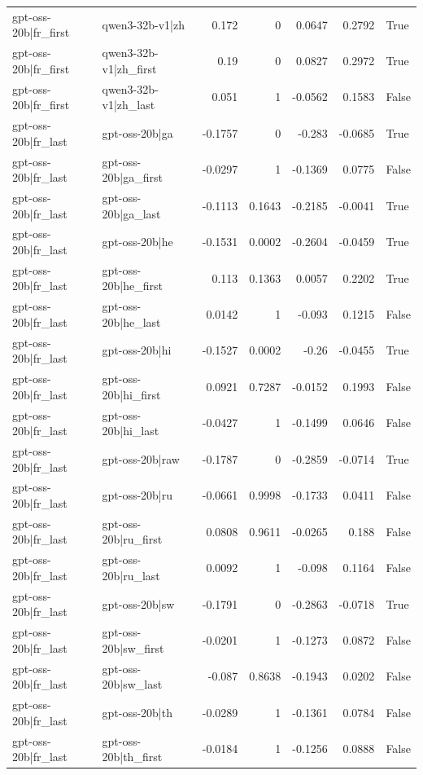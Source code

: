 \begin{table}
\begin{tabular}{l l r r r r l}
gpt-oss-20b|fr_first & qwen3-32b-v1|zh & 0.172 & 0 & 0.0647 & 0.2792 & True \\
gpt-oss-20b|fr_first & qwen3-32b-v1|zh_first & 0.19 & 0 & 0.0827 & 0.2972 & True \\
gpt-oss-20b|fr_first & qwen3-32b-v1|zh_last & 0.051 & 1 & -0.0562 & 0.1583 & False \\
gpt-oss-20b|fr_last & gpt-oss-20b|ga & -0.1757 & 0 & -0.283 & -0.0685 & True \\
gpt-oss-20b|fr_last & gpt-oss-20b|ga_first & -0.0297 & 1 & -0.1369 & 0.0775 & False \\
gpt-oss-20b|fr_last & gpt-oss-20b|ga_last & -0.1113 & 0.1643 & -0.2185 & -0.0041 & True \\
gpt-oss-20b|fr_last & gpt-oss-20b|he & -0.1531 & 0.0002 & -0.2604 & -0.0459 & True \\
gpt-oss-20b|fr_last & gpt-oss-20b|he_first & 0.113 & 0.1363 & 0.0057 & 0.2202 & True \\
gpt-oss-20b|fr_last & gpt-oss-20b|he_last & 0.0142 & 1 & -0.093 & 0.1215 & False \\
gpt-oss-20b|fr_last & gpt-oss-20b|hi & -0.1527 & 0.0002 & -0.26 & -0.0455 & True \\
gpt-oss-20b|fr_last & gpt-oss-20b|hi_first & 0.0921 & 0.7287 & -0.0152 & 0.1993 & False \\
gpt-oss-20b|fr_last & gpt-oss-20b|hi_last & -0.0427 & 1 & -0.1499 & 0.0646 & False \\
gpt-oss-20b|fr_last & gpt-oss-20b|raw & -0.1787 & 0 & -0.2859 & -0.0714 & True \\
gpt-oss-20b|fr_last & gpt-oss-20b|ru & -0.0661 & 0.9998 & -0.1733 & 0.0411 & False \\
gpt-oss-20b|fr_last & gpt-oss-20b|ru_first & 0.0808 & 0.9611 & -0.0265 & 0.188 & False \\
gpt-oss-20b|fr_last & gpt-oss-20b|ru_last & 0.0092 & 1 & -0.098 & 0.1164 & False \\
gpt-oss-20b|fr_last & gpt-oss-20b|sw & -0.1791 & 0 & -0.2863 & -0.0718 & True \\
gpt-oss-20b|fr_last & gpt-oss-20b|sw_first & -0.0201 & 1 & -0.1273 & 0.0872 & False \\
gpt-oss-20b|fr_last & gpt-oss-20b|sw_last & -0.087 & 0.8638 & -0.1943 & 0.0202 & False \\
gpt-oss-20b|fr_last & gpt-oss-20b|th & -0.0289 & 1 & -0.1361 & 0.0784 & False \\
gpt-oss-20b|fr_last & gpt-oss-20b|th_first & -0.0184 & 1 & -0.1256 & 0.0888 & False \\

\end{tabular}
\end{table}
